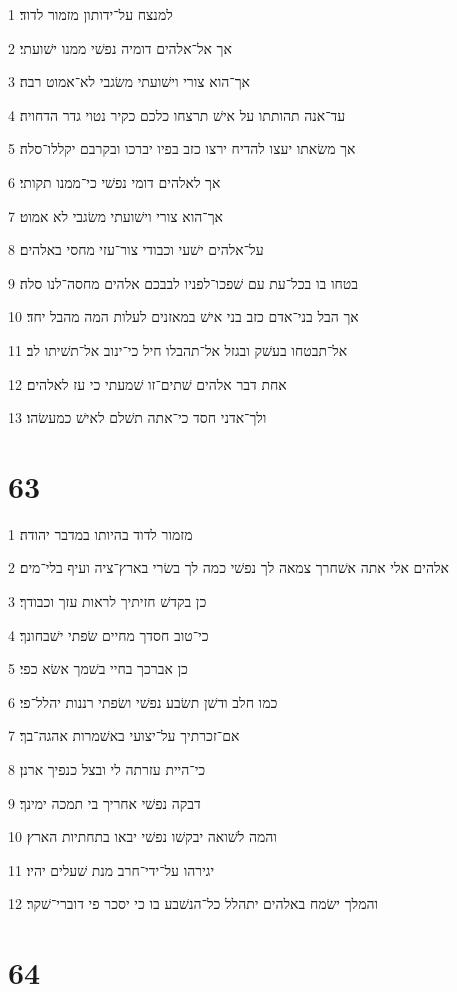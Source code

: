 \par 1 למנצח על־ידותון מזמור לדוד׃
\par 2 אך אל־אלהים דומיה נפשׁי ממנו ישׁועתי׃
\par 3 אך־הוא צורי וישׁועתי משׂגבי לא־אמוט רבה׃
\par 4 עד־אנה תהותתו על אישׁ תרצחו כלכם כקיר נטוי גדר הדחויה׃
\par 5 אך משׂאתו יעצו להדיח ירצו כזב בפיו יברכו ובקרבם יקללו־סלה׃
\par 6 אך לאלהים דומי נפשׁי כי־ממנו תקותי׃
\par 7 אך־הוא צורי וישׁועתי משׂגבי לא אמוט׃
\par 8 על־אלהים ישׁעי וכבודי צור־עזי מחסי באלהים׃
\par 9 בטחו בו בכל־עת עם שׁפכו־לפניו לבבכם אלהים מחסה־לנו סלה׃
\par 10 אך הבל בני־אדם כזב בני אישׁ במאזנים לעלות המה מהבל יחד׃
\par 11 אל־תבטחו בעשׁק ובגזל אל־תהבלו חיל כי־ינוב אל־תשׁיתו לב׃
\par 12 אחת דבר אלהים שׁתים־זו שׁמעתי כי עז לאלהים׃
\par 13 ולך־אדני חסד כי־אתה תשׁלם לאישׁ כמעשׂהו׃

\chapter{63}

\par 1 מזמור לדוד בהיותו במדבר יהודה׃
\par 2 אלהים אלי אתה אשׁחרך צמאה לך נפשׁי כמה לך בשׂרי בארץ־ציה ועיף בלי־מים׃
\par 3 כן בקדשׁ חזיתיך לראות עזך וכבודך׃
\par 4 כי־טוב חסדך מחיים שׂפתי ישׁבחונך׃
\par 5 כן אברכך בחיי בשׁמך אשׂא כפי׃
\par 6 כמו חלב ודשׁן תשׂבע נפשׁי ושׂפתי רננות יהלל־פי׃
\par 7 אם־זכרתיך על־יצועי באשׁמרות אהגה־בך׃
\par 8 כי־היית עזרתה לי ובצל כנפיך ארנן׃
\par 9 דבקה נפשׁי אחריך בי תמכה ימינך׃
\par 10 והמה לשׁואה יבקשׁו נפשׁי יבאו בתחתיות הארץ׃
\par 11 יגירהו על־ידי־חרב מנת שׁעלים יהיו׃
\par 12 והמלך ישׂמח באלהים יתהלל כל־הנשׁבע בו כי יסכר פי דוברי־שׁקר׃

\chapter{64}

